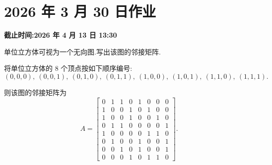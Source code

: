 \section*{2026 年 3 月 30 日作业}
{}
\noindent\textbf{截止时间:2026 年 4 月 13 日 13:30}
\setcounter{problem}{0}
\setcounter{sollemma}{0}

\begin{problem}
单位立方体可视为一个无向图.写出该图的邻接矩阵.
\begin{solution}
    将单位立方体的 $8$ 个顶点按如下顺序编号:
    \[
        (0,0,0),\ (0,0,1),\ (0,1,0),\ (0,1,1),\ (1,0,0),\ (1,0,1),\ (1,1,0),\ (1,1,1).
    \]
    
    则该图的邻接矩阵为
    \[
        A=
        \begin{bmatrix}
            0 & 1 & 1 & 0 & 1 & 0 & 0 & 0\\
            1 & 0 & 0 & 1 & 0 & 1 & 0 & 0\\
            1 & 0 & 0 & 1 & 0 & 0 & 1 & 0\\
            0 & 1 & 1 & 0 & 0 & 0 & 0 & 1\\
            1 & 0 & 0 & 0 & 0 & 1 & 1 & 0\\
            0 & 1 & 0 & 0 & 1 & 0 & 0 & 1\\
            0 & 0 & 1 & 0 & 1 & 0 & 0 & 1\\
            0 & 0 & 0 & 1 & 0 & 1 & 1 & 0
        \end{bmatrix}.
    \]
\end{solution}
\end{problem}

